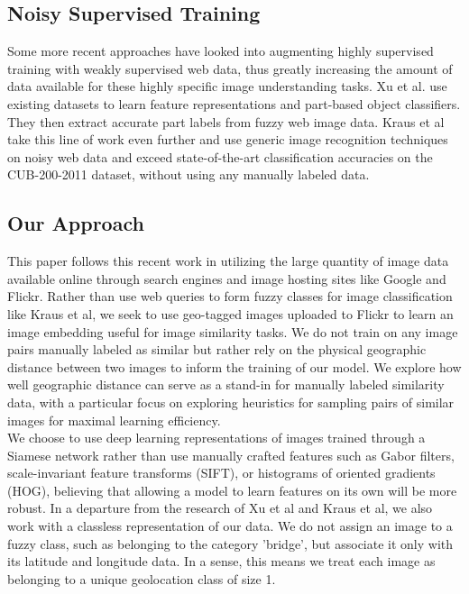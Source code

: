 \documentclass[pageno]{jpaper}
\begin{document}
\subsection*{Noisy Supervised Training}

Some more recent approaches have looked into augmenting highly supervised training with weakly supervised web data, thus greatly increasing the amount of data available for these highly specific image understanding tasks. Xu et al.\cite{xu2015augmenting} use existing datasets to learn feature representations and part-based object classifiers. They then extract accurate part labels from fuzzy web image data. Kraus et al take this line of work even further and use generic image recognition techniques on noisy web data and exceed state-of-the-art classification accuracies on the CUB-200-2011 dataset, without using any manually labeled data.\cite{krause2016unreasonable}\\

\subsection*{Our Approach}
This paper follows this recent work in utilizing the large quantity of image data available online through search engines and image hosting sites like Google and Flickr. Rather than use web queries to form fuzzy classes for image classification like Kraus et al, we seek to use geo-tagged images uploaded to Flickr to learn an image embedding useful for image similarity tasks. We do not train on any image pairs manually labeled as similar but rather rely on the physical geographic distance between two images to inform the training of our model. We explore how well geographic distance can serve as a stand-in for manually labeled similarity data, with a particular focus on exploring heuristics for sampling pairs of similar images for maximal learning efficiency.\\

We choose to use deep learning representations of images trained through a Siamese network rather than use manually crafted features such as Gabor filters, scale-invariant feature transforms (SIFT), or histograms of oriented gradients (HOG), believing that allowing a model to learn features on its own will be more robust. In a departure from the research of Xu et al and Kraus et al, we also work with a classless representation of our data. We do not assign an image to a fuzzy class, such as belonging to the category 'bridge', but associate it only with its latitude and longitude data. In a sense, this means we treat each image as belonging to a unique geolocation class of size 1.\\
\end{document}
